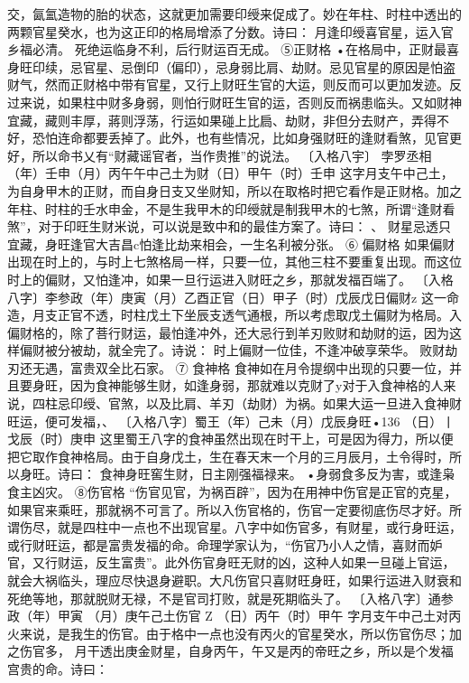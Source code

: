 交，氤氳造物的胎的状态，这就更加需要印绶来促成了。妙在年柱、时柱中透出的两颗官星癸水，也为这正印的格局增添了分数。诗曰：
月逢印绶喜官星，运入官乡福必清。
死绝运临身不利，后行财运百无成。
⑤正财格
•在格局中，正财最喜身旺印续，忌官星、忌倒印（偏印），忌身弱比肩、劫财。忌见官星的原因是怕盗财气，然而正财格中带有官星，又行上财旺生官的大运，则反而可以更加发迹。反过来说，如果柱中财多身弱，则怕行财旺生官的运，否则反而祸患临头。又如财神宜藏，藏则丰厚，蔣则浮荡，行运如果碰上比扃、劫财，非但分去财产，弄得不好，恐怕连命都要丢掉了。此外，也有些情况，比如身强财旺的逢财看煞，见官更好，所以命书乂有“财藏谣官者，当作贵推”的说法。
〔入格八宇〕	孛罗丞相
（年）壬申（月）丙午午中己土为财（日）甲午（时）壬申
这字月支午中己土，为自身甲木的正财，而自身日支又坐财知，所以在取格时把它看作是正财格。加之年柱、时柱的壬水申金，不是生我甲木的印绶就是制我甲木的七煞，所谓“逢财看煞”，对于印旺生财米说，可以说是致中和的最佳方案了。诗曰：	、
财星忌透只宜藏，身旺逢官大吉昌c怕逢比劫来相会，一生名利被分张。
⑥	偏财格
如果偏财出现在时上的，与时上七煞格局一样，只要一位，其他三柱不要重复出现。而这位时上的偏财，又怕逢冲，如果一旦行运进入财旺之乡，那就发福百端了。
〔入格八字〕李参政（年）庚寅（月）乙酉正官（日）甲子（时）戊辰戊日偏财z
这一命造，月支正官不透，时柱戊土下坐辰支透气通根，所以考虑取戊土偏财为格局。入偏财格的，除了菩行财运，最怕逢冲外，还大忌行到羊刃败财和劫财的运，因为这样偏财被分被劫，就全完了。诗说：
时上偏财一位佳，不逢冲破享荣华。
败财劫刃还无遇，富贵双全比石家。
⑦	食神格
食神如在月令提纲中出现的只要一位，并且要身旺，因为食神能够生财，如逢身弱，那就难以克财了y对于入食神格的人来说，四柱忌印绶、官煞，以及比肩、羊刃（劫财）为祸。如果大运一旦进入食神财旺运，便可发福，、
〔入格八字〕蜀王（年）己未（月）戊辰身旺•136
（日）丨戈辰（时）庚申
这里蜀王八字的食神虽然出现在时干上，可是因为得力，所以便把它取作食神格局。由于自身戊土，生在春天末一个月的三月辰月，土令得时，所以身旺。诗曰：
食神身旺窖生财，日主刚强福禄来。
•身弱食多反为害，或逢枭食主凶灾。
⑧伤官格
“伤官见官，为祸百辟”，因为在用神中伤官是正官的克星，如果官来乘旺，那就祸不可言了。所以入伤官格的，伤官一定要彻底伤尽才好。所谓伤尽，就是四柱中一点也不出现官星。八字中如伤官多，有财星，或行身旺运，或行财旺运，都是富贵发福的命。命理学家认为，“伤官乃小人之情，喜财而妒官，又行财运，反生富贵”。此外伤官身旺无财的凶，这种人如果一旦碰上官运，就会大祸临头，理应尽快退身避职。大凡伤官只喜财旺身旺，如果行运进入财衰和死绝等地，那就脱财无禄，不是官司打败，就是死期临头了。
〔入格八字〕通参政（年）甲寅
（月）庚午己土伤官	Z
（日）丙午（时）甲午
字月支午中己土对丙火来说，是我生的伤官。由于格中一点也没有丙火的官星癸水，所以伤官伤尽；加之伤官多，
月干透出庚金财星，自身丙午，午又是丙的帝旺之乡，所以是个发福宫贵的命。诗曰：
